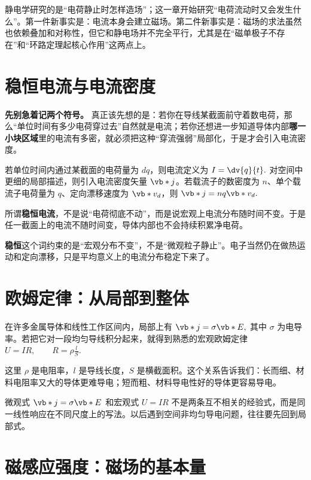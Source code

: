 \documentclass[lang=cn,11pt]{elegantbook}
\newcommand{\bridge}[1]{\begin{note}#1\end{note}}
\begin{document}
\bridge{静电学研究的是“电荷静止时怎样造场”；这一章开始研究“电荷流动时又会发生什么”。第一件新事实是：电流本身会建立磁场。第二件新事实是：磁场的求法虽然也依赖叠加和对称性，但它和静电场并不完全平行，尤其是在“磁单极子不存在”和“环路定理起核心作用”这两点上。}

\section{稳恒电流与电流密度}

\textbf{先别急着记两个符号。} 真正该先想的是：若你在导线某截面前守着数电荷，那么“单位时间有多少电荷穿过去”自然就是电流；若你还想进一步知道导体内部\textbf{哪一小块区域}里的电流有多密，就必须把这种“穿流强弱”局部化，于是才会引入电流密度。

若单位时间内通过某截面的电荷量为 \(dq\)，则电流定义为
 \(I=\dv{q}{t}.\) 
对空间中更细的局部描述，则引入电流密度矢量 \(\vb*{j}\)。若载流子的数密度为 \(n\)、单个载流子电荷量为 \(q\)、定向漂移速度为 \(\vb*{v}_d\)，则
 \(\vb*{j}=nq\vb*{v}_d.\) 

所谓\textbf{稳恒电流}，不是说“电荷彻底不动”，而是说宏观上电流分布随时间不变。于是任一截面上的电流不随时间变，导体内部也不会持续积累净电荷。

\begin{note}
\textbf{稳恒}这个词约束的是“宏观分布不变”，不是“微观粒子静止”。电子当然仍在做热运动和定向漂移，只是平均意义上的电流分布稳定下来了。
\end{note}

\section{欧姆定律：从局部到整体}

在许多金属导体和线性工作区间内，局部上有
 \(\vb*{j}=\sigma \vb*{E},\) 
其中 \(\sigma\) 为电导率。若把它对一段均匀导线积分起来，就得到熟悉的宏观欧姆定律
 \(U=IR, \qquad R=\rho\frac{l}{S}.\) 

这里 \(\rho\) 是电阻率，\(l\) 是导线长度，\(S\) 是横截面积。这个关系告诉我们：长而细、材料电阻率又大的导体更难导电；短而粗、材料导电性好的导体更容易导电。

\begin{remark}
微观式 \(\vb*{j}=\sigma\vb*{E}\) 和宏观式 \(U=IR\) 不是两条互不相关的经验式，而是同一线性响应在不同尺度上的写法。以后遇到空间非均匀导电问题，往往要先回到局部式。
\end{remark}

\section{磁感应强度：磁场的基本量}
\end{document}
